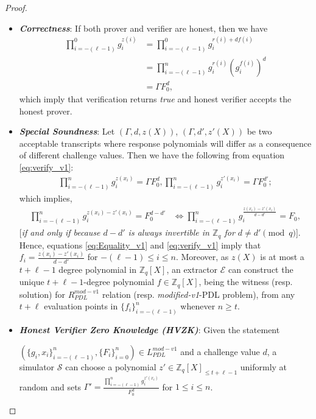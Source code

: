 \begin{proof}
  \begin{itemize}
    \item \textit{\textbf{Correctness}}: If both prover and verifier are honest, then we have 
      \begin{align}\label{eq:verify_v1}
        \prod_{i=-(\ell-1)}^{0}g_i^{z(i)}&=\prod_{i=-(\ell-1)}^{0}g_i^{r(i)+df(i)}\nonumber\\
        &=\prod_{i=-(\ell-1)}^{n}g_i^{r(i)}(g_i^{f(i)})^d\nonumber\\
        &=\Gamma F_0^d,
      \end{align}
      which imply that verification returns \textit{true} and honest verifier accepts the honest prover.
    \item \textit{\textbf{Special Soundness}}: Let $(\Gamma,d,z(X))$, $(\Gamma,d',z'(X))$ 
      be two acceptable transcripts where response polynomials will differ as a consequence of different challenge 
      values. Then we have the following from equation \ref{eq:verify_v1}:
      \begin{align*}
        \prod_{i=-(\ell-1)}^{n}g_i^{z(x_i)}=\Gamma F_0^d,\prod_{i=-(\ell-1)}^{n}g_i^{z'(x_i)}=\Gamma F_0^{d'};
      \end{align*}
      which implies,
      \begin{align}\label{eq:Equality_v1}
        \prod_{i=-(\ell-1)}^{n}g_i^{z(x_i)-z'(x_i)}=F_0^{d-d'} &\iff \prod_{i=-(\ell-1)}^{n}g_i^{\frac{z(x_i)-z'(x_i)}{d-d'}}=F_0,
      \end{align}
      [\textit{if and only if because $d-d'$ is always invertible in $\mathbb{Z}_q$ for $d\neq d'\pmod{q}$}]. 
      Hence, equations \ref{eq:Equality_v1} and \ref{eq:verify_v1} imply that $f_i=\frac{z(x_i)-z'(x_i)}{d-d'}$ for 
      $-(\ell-1)\leq i\leq n$. Moreover, as $z(X)$ is at most a $t+\ell-1$ degree 
      polynomial in $\mathbb{Z}_q[X]$, an extractor $\mathcal{E}$ can construct the unique $t+\ell-1$-degree 
      polynomial $f\in\mathbb{Z}_q[X]$, being the witness (resp. solution) for $R_{PDL}^{mod-v1}$ relation (resp. \textit{modified-v1}-PDL problem), 
      from any $t+\ell$ evaluation points in $\{f_i\}_{i=-(\ell-1)}^n$ whenever $n\geq t$.
    \item \textit{\textbf{Honest Verifier Zero Knowledge (HVZK)}}: Given the statement\par $(\{g_i,x_i\}_{i=-(\ell-1)}^n,\{F_i\}_{i=0}^n)\in L_{PDL}^{mod-v1}$  
      and a challenge value $d$, a simulator $\mathcal{S}$ can choose a polynomial $z'\in\mathbb{Z}_q[X]_{\leq t+\ell-1}$ uniformly 
      at random and sets $\Gamma'=\frac{\prod_{i=-(\ell-1)}^{n}g_i^{z'(x_i)}}{F_0^d}$ for $1\leq i\leq n$. 

\end{itemize}
\end{proof}
